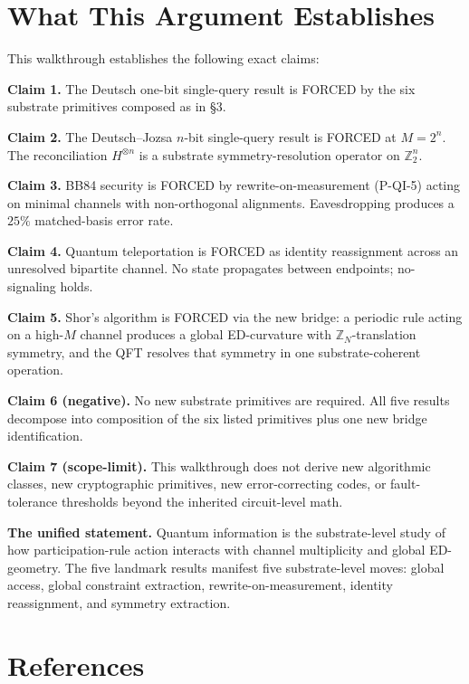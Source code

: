 \documentclass[11pt,a4paper]{article}
\begin{document}
\section{What This Argument Establishes}

This walkthrough establishes the following exact claims:

\textbf{Claim 1.} The Deutsch one-bit single-query result is FORCED by the six substrate primitives composed as in \S3.

\textbf{Claim 2.} The Deutsch--Jozsa $n$-bit single-query result is FORCED at $M = 2^n$. The reconciliation $H^{\otimes n}$ is a substrate symmetry-resolution operator on $\mathbb{Z}_2^n$.

\textbf{Claim 3.} BB84 security is FORCED by rewrite-on-measurement (P-QI-5) acting on minimal channels with non-orthogonal alignments. Eavesdropping produces a $25\%$ matched-basis error rate.

\textbf{Claim 4.} Quantum teleportation is FORCED as identity reassignment across an unresolved bipartite channel. No state propagates between endpoints; no-signaling holds.

\textbf{Claim 5.} Shor's algorithm is FORCED via the new bridge: a periodic rule acting on a high-$M$ channel produces a global ED-curvature with $\mathbb{Z}_N$-translation symmetry, and the QFT resolves that symmetry in one substrate-coherent operation.

\textbf{Claim 6 (negative).} No new substrate primitives are required. All five results decompose into composition of the six listed primitives plus one new bridge identification.

\textbf{Claim 7 (scope-limit).} This walkthrough does not derive new algorithmic classes, new cryptographic primitives, new error-correcting codes, or fault-tolerance thresholds beyond the inherited circuit-level math.

\textbf{The unified statement.} Quantum information is the substrate-level study of how participation-rule action interacts with channel multiplicity and global ED-geometry. The five landmark results manifest five substrate-level moves: global access, global constraint extraction, rewrite-on-measurement, identity reassignment, and symmetry extraction.

\section*{References}
\end{document}
